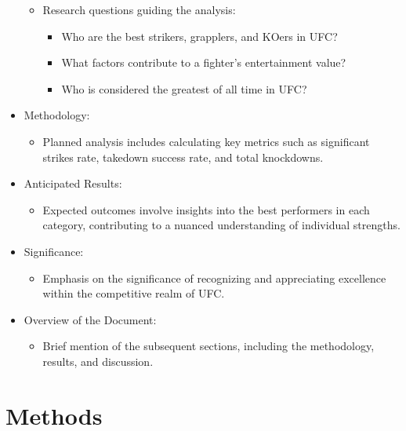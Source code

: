 \documentclass[
  man,floatsintext]{apa6}
\providecommand{\tightlist}{%
  \setlength{\itemsep}{0pt}\setlength{\parskip}{0pt}}
\begin{document}
\begin{itemize}
  \begin{itemize}
  \tightlist
  \item
    Research questions guiding the analysis:

    \begin{itemize}
    \tightlist
    \item
      Who are the best strikers, grapplers, and KOers in UFC?
    \item
      What factors contribute to a fighter's entertainment value?
    \item
      Who is considered the greatest of all time in UFC?
    \end{itemize}
  \end{itemize}
\item
  Methodology:

  \begin{itemize}
  \tightlist
  \item
    Planned analysis includes calculating key metrics such as significant strikes rate, takedown success rate, and total knockdowns.
  \end{itemize}
\item
  Anticipated Results:

  \begin{itemize}
  \tightlist
  \item
    Expected outcomes involve insights into the best performers in each category, contributing to a nuanced understanding of individual strengths.
  \end{itemize}
\item
  Significance:

  \begin{itemize}
  \tightlist
  \item
    Emphasis on the significance of recognizing and appreciating excellence within the competitive realm of UFC.
  \end{itemize}
\item
  Overview of the Document:

  \begin{itemize}
  \tightlist
  \item
    Brief mention of the subsequent sections, including the methodology, results, and discussion.
  \end{itemize}
\end{itemize}

\hypertarget{methods}{%
\section{Methods}\label{methods}}
\end{document}
